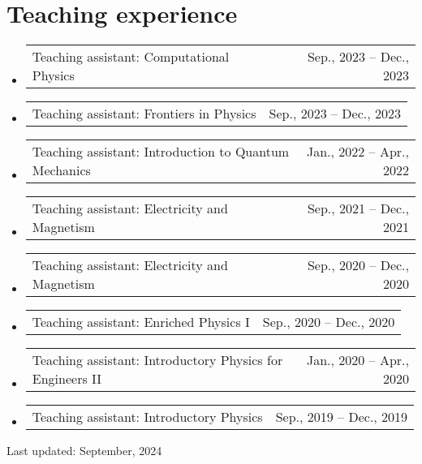\documentclass[letterpaper,11pt]{article}
\makeatletter
\newcommand{\TeachingItem}[2]{
	\item{\vspace{-1pt}
		\begin{tabular*}{0.92\textwidth}{l@{\extracolsep{\fill}}r}
			{#1} & {#2}
		\end{tabular*}
		\vspace{-5pt}
	}
}
\makeatother
\begin{document}
\section*{Teaching experience}
\begin{itemize}[leftmargin=*]
	\TeachingItem{Teaching assistant: Computational Physics}{Sep., 2023 -- Dec., 2023}
	\TeachingItem{Teaching assistant: Frontiers in Physics}{Sep., 2023 -- Dec., 2023}
	\TeachingItem{Teaching assistant: Introduction to Quantum Mechanics}{Jan., 2022 -- Apr., 2022}
	\TeachingItem{Teaching assistant: Electricity and Magnetism}{Sep., 2021 -- Dec., 2021}
	\TeachingItem{Teaching assistant: Electricity and Magnetism}{Sep., 2020 -- Dec., 2020}
	\TeachingItem{Teaching assistant: Enriched Physics I}{Sep., 2020 -- Dec., 2020}
	\TeachingItem{Teaching assistant: Introductory Physics for Engineers II}{Jan., 2020 -- Apr., 2020}
	\TeachingItem{Teaching assistant: Introductory Physics}{Sep., 2019 -- Dec., 2019}
\end{itemize}

\vspace{1cm}

\begin{flushright}
	Last updated: September, 2024
\end{flushright}
\end{document}

